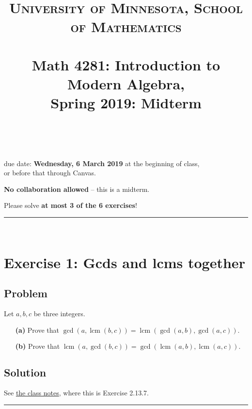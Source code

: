 \documentclass[paper=a4, fontsize=12pt]{scrartcl} %
\title{	
\normalfont \normalsize 
\textsc{University of Minnesota, School of Mathematics} \\ [25pt] %
\horrule{0.5pt} \\[0.4cm] %
\huge Math 4281: Introduction to Modern Algebra, \\
Spring 2019:
Midterm \psetnumber\\%
\horrule{2pt} \\[0.5cm] %
}
\author{\myname}
\newcommand{\lcm}{\operatorname{lcm}}
\newcommand{\tup}[1]{\left( #1 \right)}
\newcommand{\horrule}[1]{\rule{\linewidth}{#1}} %
\theoremstyle{plainsl}
\theoremstyle{definition}
\theoremstyle{remark}
\begin{document}
\maketitle %

\begin{center} %
{\large due date: \textbf{Wednesday, 6 March 2019} at the beginning of class, \\
or before that through Canvas.

\textbf{No collaboration allowed} -- this is a midterm.

Please solve \textbf{at most 3 of the 6 exercises}!}
\end{center}

\horrule{0.3pt} \\[0.4cm]

\section{Exercise 1: Gcds and lcms together}

\subsection{Problem}

Let $a, b, c$ be three integers.

\begin{enumerate}

\item[\textbf{(a)}]
Prove that
$\gcd\tup{a, \lcm\tup{b, c}}
= \lcm\tup{\gcd\tup{a, b}, \gcd\tup{a, c}}$.

\item[\textbf{(b)}]
Prove that
$\lcm\tup{a, \gcd\tup{b, c}}
= \gcd\tup{\lcm\tup{a, b}, \lcm\tup{a, c}}$.

\end{enumerate}

\subsection{Solution}

See
\href{http://www-users.math.umn.edu/~dgrinber/19s/notes.pdf}{the class notes},
where this is Exercise 2.13.7.

\horrule{0.3pt} \\[0.4cm]
\end{document}
